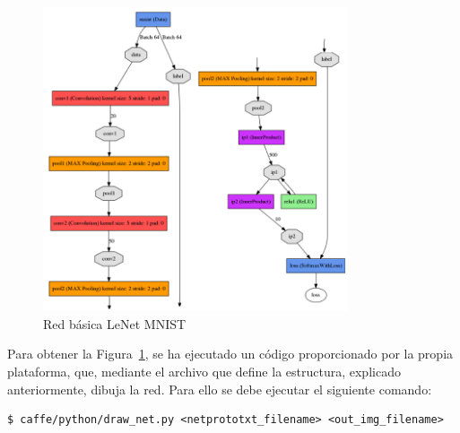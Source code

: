 \begin{description}
	\begin{figure}[h!]
		\begin{center}
			\includegraphics[width=0.8\textwidth]{figures/Original_net}
			\caption{Red básica LeNet MNIST}
			\label{fig.redBasica}
		\end{center}
	\end{figure}
	
	Para obtener la Figura~\ref{fig.redBasica}, se ha ejecutado un código proporcionado por la propia plataforma, que, mediante el archivo que define la estructura, explicado anteriormente, dibuja la red. Para ello se debe ejecutar el siguiente comando:
	\vspace{5pt}
	\begin{lstlisting}[frame=single]
	$ caffe/python/draw_net.py <netprototxt_filename> <out_img_filename>
	\end{lstlisting}
	

\end{description}
